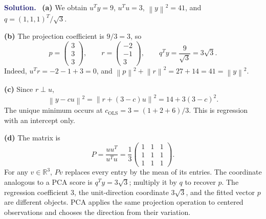 \documentclass[11pt]{article}
\newcommand{\R}{\mathbb R}
\newcommand{\norm}[1]{\left\lVert#1\right\rVert}
\newcommand{\ols}{\mathrm{OLS}}
\newenvironment{answer}{\par\medskip\noindent\textcolor{MidnightBlue}{\textbf{Solution.}}\ }{\par\medskip}
\begin{document}
\begin{answer}
\textbf{(a)} We obtain $u^Ty=9$, $u^Tu=3$, $\norm{y}^2=41$, and
$q=(1,1,1)^T/\sqrt3$.

\textbf{(b)} The projection coefficient is $9/3=3$, so
\[
 p=\begin{pmatrix}3\\3\\3\end{pmatrix},\qquad
 r=\begin{pmatrix}-2\\-1\\3\end{pmatrix},\qquad
 q^Ty=\frac9{\sqrt3}=3\sqrt3.
\]
Indeed, $u^Tr=-2-1+3=0$, and
$\norm{p}^2+\norm{r}^2=27+14=41=\norm{y}^2$.

\textbf{(c)} Since $r\perp u$,
\[
 \norm{y-cu}^2=\norm{r+(3-c)u}^2
 =14+3(3-c)^2.
\]
The unique minimum occurs at $\boxed{c_{\ols}=3=(1+2+6)/3}$.
This is regression with an intercept only.

\textbf{(d)} The matrix is
\[
 P=\frac{uu^T}{u^Tu}=\frac13
 \begin{pmatrix}1&1&1\\1&1&1\\1&1&1\end{pmatrix}.
\]
For any $v\in\R^3$, $Pv$ replaces every entry by the mean of its entries.
The coordinate analogous to a PCA score is $q^Ty=3\sqrt3$;
multiply it by $q$ to recover $p$. The regression coefficient $3$, the
unit-direction coordinate $3\sqrt3$, and the fitted vector $p$ are
different objects. PCA applies the same projection operation to
centered observations and chooses the direction from their variation.
\end{answer}

\newpage
\end{document}
